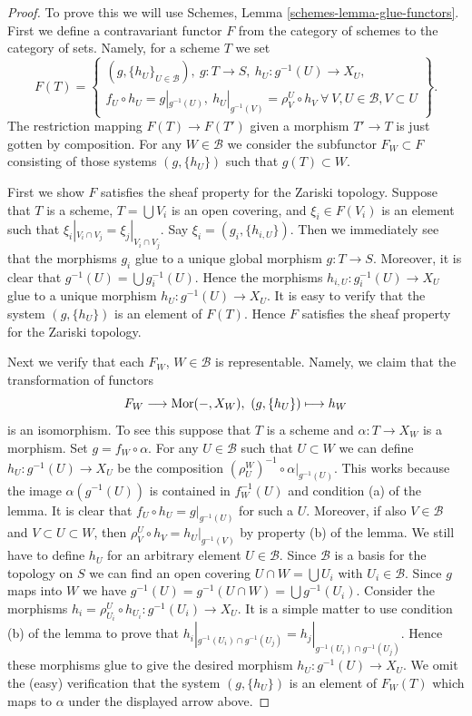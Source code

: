 \begin{proof}
To prove this we will use Schemes, Lemma \ref{schemes-lemma-glue-functors}.
First we define a contravariant functor $F$ from the category of schemes
to the category of sets. Namely, for a scheme $T$ we set
$$
F(T) =
\left\{
\begin{matrix}
(g, \{h_U\}_{U \in \mathcal{B}}),
\ g : T \to S, \ h_U : g^{-1}(U) \to X_U, \\
f_U \circ h_U = g|_{g^{-1}(U)},
\ h_U|_{g^{-1}(V)} = \rho^U_V \circ h_V
\ \forall\ V, U \in \mathcal{B}, V \subset U
\end{matrix}
\right\}.
$$
The restriction mapping $F(T) \to F(T')$ given a morphism
$T' \to T$ is just gotten by composition.
For any $W \in \mathcal{B}$ we consider the subfunctor
$F_W \subset F$ consisting of those systems $(g, \{h_U\})$
such that $g(T) \subset W$.

\medskip\noindent
First we show $F$ satisfies the sheaf property for the Zariski topology.
Suppose that $T$ is a scheme, $T = \bigcup V_i$ is an open covering,
and $\xi_i \in F(V_i)$ is an element such that
$\xi_i|_{V_i \cap V_j} = \xi_j|_{V_i \cap V_j}$.
Say $\xi_i = (g_i, \{h_{i, U}\})$. Then we immediately see that
the morphisms $g_i$ glue to a unique global morphism
$g : T \to S$. Moreover, it is clear that
$g^{-1}(U) = \bigcup g_i^{-1}(U)$. Hence the morphisms
$h_{i, U} : g_i^{-1}(U) \to X_U$ glue to a unique morphism
$h_U : g^{-1}(U) \to X_U$. It is easy to verify that the system
$(g, \{h_U\})$ is an element of $F(T)$. Hence $F$ satisfies the
sheaf property for the Zariski topology.

\medskip\noindent
Next we verify that each $F_W$, $W \in \mathcal{B}$ is representable.
Namely, we claim that the transformation of functors
$$
F_W \longrightarrow \mathop{\mathrm{Mor}}\nolimits(-, X_W), \ (g, \{h_U\}) \longmapsto h_W
$$
is an isomorphism. To see this suppose that $T$ is a scheme and
$\alpha : T \to X_W$ is a morphism. Set $g = f_W \circ \alpha$.
For any $U \in \mathcal{B}$ such that $U \subset W$ we can
define $h_U : g^{-1}(U) \to X_U$ be the composition
$(\rho^W_U)^{-1} \circ \alpha|_{g^{-1}(U)}$. This works because
the image $\alpha(g^{-1}(U))$ is contained in $f_W^{-1}(U)$ and
condition (a) of the lemma. It is clear that
$f_U \circ h_U = g|_{g^{-1}(U)}$ for such a $U$.
Moreover, if also $V \in \mathcal{B}$ and $V \subset U \subset W$,
then $\rho^U_V \circ h_V = h_U|_{g^{-1}(V)}$ by property (b)
of the lemma. We still have to define $h_U$ for an arbitrary
element $U \in \mathcal{B}$. Since $\mathcal{B}$ is a basis for
the topology on $S$ we can find an open covering
$U \cap W = \bigcup U_i$ with $U_i \in \mathcal{B}$. Since $g$ maps into $W$
we have
$g^{-1}(U) = g^{-1}(U \cap W) = \bigcup g^{-1}(U_i)$.
Consider the morphisms
$h_i = \rho^U_{U_i} \circ h_{U_i} : g^{-1}(U_i) \to X_U$.
It is a simple matter to use condition (b) of the lemma
to prove that
$h_i|_{g^{-1}(U_i) \cap g^{-1}(U_j)} = h_j|_{g^{-1}(U_i) \cap g^{-1}(U_j)}$.
Hence these morphisms glue to give the desired morphism
$h_U : g^{-1}(U) \to X_U$. We omit the (easy) verification that
the system $(g, \{h_U\})$ is an element of $F_W(T)$ which
maps to $\alpha$ under the displayed arrow above.


\end{proof}
